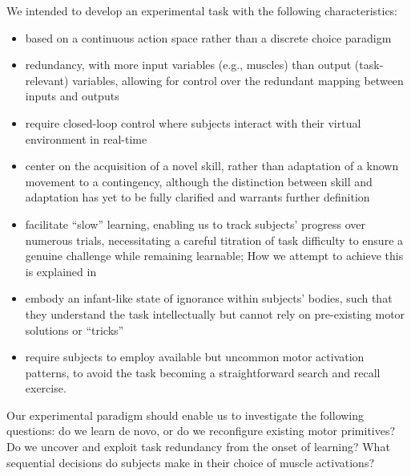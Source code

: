 \documentclass[../main.tex]{subfiles}
\begin{document}
We intended to develop an experimental task with the following characteristics: 
%
\begin{itemize}
  \item based on a continuous action space rather than a discrete choice paradigm
  \item redundancy, with more input variables (e.g., muscles) than output (task-relevant) variables, allowing for control over the redundant mapping between inputs and outputs
  \item require closed-loop control where subjects interact with their virtual environment in real-time
  \item center on the acquisition of a novel skill, rather than adaptation of a known movement to a contingency, although the distinction between skill and adaptation has yet to be fully clarified and warrants further definition
  \item facilitate ``slow'' learning, enabling us to track subjects' progress over numerous trials, necessitating a careful titration of task difficulty to ensure a genuine challenge while remaining learnable; How we attempt to achieve this is explained in 
  \item embody an infant-like state of ignorance within subjects' bodies, such that they understand the task intellectually but cannot rely on pre-existing motor solutions or ``tricks''
  \item require subjects to employ available but uncommon motor activation patterns, to avoid the task becoming a straightforward search and recall exercise.
\end{itemize}
%
Our experimental paradigm should enable us to investigate the following questions: do we learn de novo, or do we reconfigure existing motor primitives? Do we uncover and exploit task redundancy from the onset of learning? What sequential decisions do subjects make in their choice of muscle activations?
\end{document}
